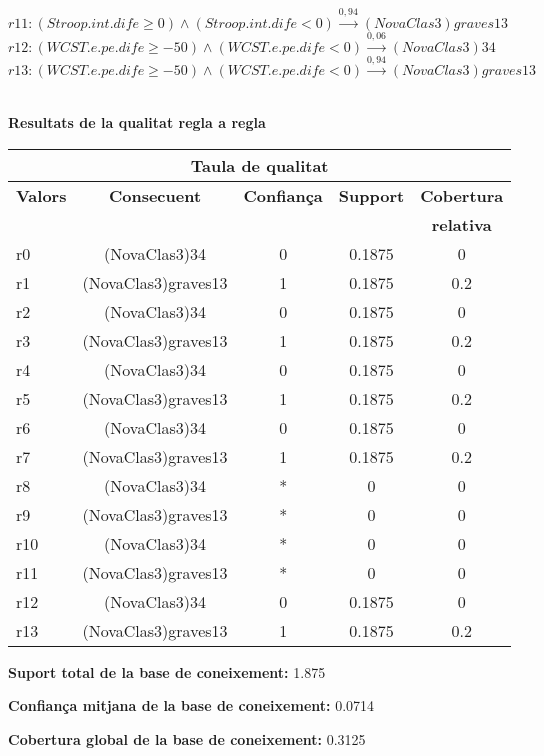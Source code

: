 $r11: (Stroop.int.dife \geq 0) \wedge (Stroop.int.dife < 0)\stackrel{0,94}{\longrightarrow} (NovaClas3)graves13$\\

$r12: (WCST.e.pe.dife \geq -50) \wedge (WCST.e.pe.dife < 0)\stackrel{0,06}{\longrightarrow} (NovaClas3)34$\\

$r13: (WCST.e.pe.dife \geq -50) \wedge (WCST.e.pe.dife < 0)\stackrel{0,94}{\longrightarrow} (NovaClas3)graves13$\\

\newpage
\vspace{3ex}
\mbox{ }
\begin{center} \Large \bf Resultats de la qualitat regla a regla \end{center}

\begin{center}
\begin{tabular}{|p{3cm}|c|c|c|c|}
\hline
\multicolumn{5}{|c|}{\bf Taula de qualitat} \\ 
\hline
{\bf Valors} & {\bf Consecuent} & {\bf Confian\c ca} & {\bf Support} & {\bf Cobertura} \\ 
 & {\bf } & {\bf } & {\bf } & {\bf relativa} \\ 
\hline
\hline
r0 & (NovaClas3)34 & 0 & 0.1875 & 0 \\ 
\hline
r1 & (NovaClas3)graves13 & 1 & 0.1875 & 0.2 \\ 
\hline
r2 & (NovaClas3)34 & 0 & 0.1875 & 0 \\ 
\hline
r3 & (NovaClas3)graves13 & 1 & 0.1875 & 0.2 \\ 
\hline
r4 & (NovaClas3)34 & 0 & 0.1875 & 0 \\ 
\hline
r5 & (NovaClas3)graves13 & 1 & 0.1875 & 0.2 \\ 
\hline
r6 & (NovaClas3)34 & 0 & 0.1875 & 0 \\ 
\hline
r7 & (NovaClas3)graves13 & 1 & 0.1875 & 0.2 \\ 
\hline
r8 & (NovaClas3)34 & * & 0 & 0 \\ 
\hline
r9 & (NovaClas3)graves13 & * & 0 & 0 \\ 
\hline
r10 & (NovaClas3)34 & * & 0 & 0 \\ 
\hline
r11 & (NovaClas3)graves13 & * & 0 & 0 \\ 
\hline
r12 & (NovaClas3)34 & 0 & 0.1875 & 0 \\ 
\hline
r13 & (NovaClas3)graves13 & 1 & 0.1875 & 0.2 \\ 
\hline
\hline
\end{tabular}
\end{center} \vfill


{\bf Suport total de la base de coneixement:} 1.875

{\bf Confian\c ca mitjana de la base de coneixement:} 0.0714

{\bf Cobertura global de la base de coneixement:} 0.3125
\newpage
